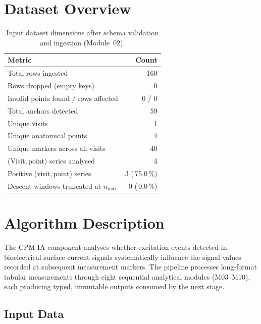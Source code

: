 \documentclass[a4paper,11pt]{article}
\begin{document}
\section{Dataset Overview}

\begin{table}[h!]
\centering
\small
\caption{Input dataset dimensions after schema validation and ingestion (Module~02).}
\begin{tabular}{lr}
\toprule
\textbf{Metric} & \textbf{Count} \\
\midrule
Total rows ingested                        & 160 \\
Rows dropped (empty keys)                  & 0 \\
Invalid points found / rows affected       & 0 / 0 \\
Total anchors detected                     & 59 \\
Unique visits                          & 1 \\
Unique anatomical points               & 4 \\
Unique markers across all visits       & 40 \\
(Visit,\,point) series analysed        & 4 \\
Positive (visit,\,point) series        & 3 (\,75.0\,\%) \\
Descent windows truncated at $n_{\max}$ & 0 (\,0.0\,\%) \\
\bottomrule
\end{tabular}
\end{table}

\section{Algorithm Description}

The CPM-IA component analyses whether excitation events detected in bioelectrical surface
current signals systematically influence the signal values recorded at subsequent measurement
markers. The pipeline processes long-format tabular measurements through eight sequential
analytical modules (M03--M10), each producing typed, immutable outputs consumed by the next
stage.

\subsection{Input Data}
\end{document}
